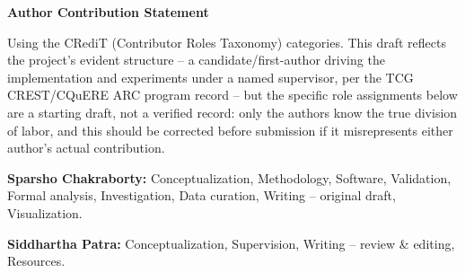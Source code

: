 \documentclass[11pt]{article}
\begin{document}
\begin{center}
{\Large\bfseries Author Contribution Statement}
\end{center}

\bigskip
\noindent Using the CRediT (Contributor Roles Taxonomy) categories. This draft reflects the project's evident structure -- a candidate/first-author driving the implementation and experiments under a named supervisor, per the TCG CREST/CQuERE ARC program record -- but the specific role assignments below are a starting draft, not a verified record: only the authors know the true division of labor, and this should be corrected before submission if it misrepresents either author's actual contribution.

\bigskip
\noindent \textbf{Sparsho Chakraborty:} Conceptualization, Methodology, Software, Validation, Formal analysis, Investigation, Data curation, Writing -- original draft, Visualization.

\bigskip
\noindent \textbf{Siddhartha Patra:} Conceptualization, Supervision, Writing -- review \& editing, Resources.
\end{document}
